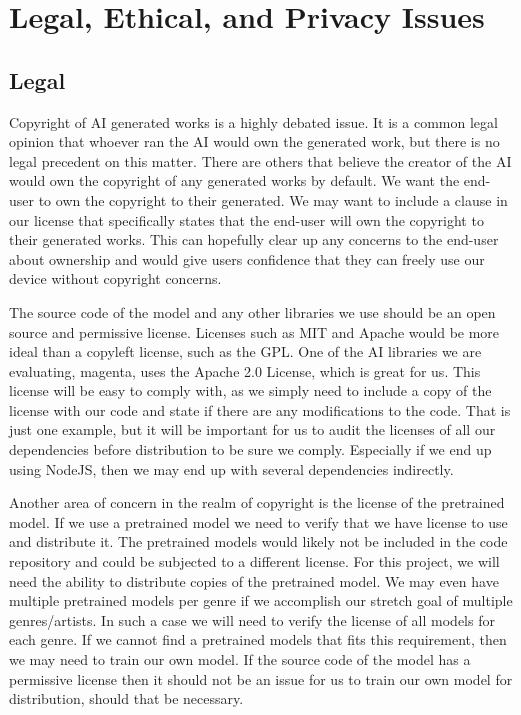 \section{Legal, Ethical, and Privacy Issues}

\subsection{Legal}

Copyright of AI generated works is a highly debated issue. It is a common legal opinion
that whoever ran the AI would own the generated work, but there is no legal precedent on
this matter. There are others that believe the creator of the AI would own the copyright
of any generated works by default. We want the end-user to own the copyright to their
generated. We may want to include a clause in our license that specifically states that
the end-user will own the copyright to their generated works. This can hopefully clear up
any concerns to the end-user about ownership and would give users confidence that they can
freely use our device without copyright concerns.

The source code of the model and any other libraries we use should be an open source and
permissive license. Licenses such as MIT and Apache would be more ideal than a copyleft
license, such as the GPL. One of the AI libraries we are evaluating, magenta, uses the
Apache 2.0 License, which is great for us. This license will be easy to comply with, as we
simply need to include a copy of the license with our code and state if there are any
modifications to the code.  That is just one example, but it will be important for us to
audit the licenses of all our dependencies before distribution to be sure we comply.
Especially if we end up using NodeJS, then we may end up with several dependencies
indirectly.

Another area of concern in the realm of copyright is the license of the pretrained model.
If we use a pretrained model we need to verify that we have license to use and distribute
it. The pretrained models would likely not be included in the code repository and could be
subjected to a different license. For this project, we will need the ability to distribute
copies of the pretrained model. We may even have multiple pretrained models per genre if
we accomplish our stretch goal of multiple genres/artists. In such a case we will need to
verify the license of all models for each genre. If we cannot find a pretrained models
that fits this requirement, then we may need to train our own model. If the source code of
the model has a permissive license then it should not be an issue for us to train our own
model for distribution, should that be necessary.

